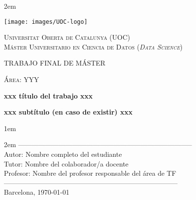 \newpage
\thispagestyle{empty}

\baselineskip 2em


\centerline{\texttt{[image: images/UOC-logo]}}
\begin{center}
\textsc{Universitat Oberta de Catalunya (UOC) \\
 Máster Universitario en Ciencia de Datos (\textit{Data Science})\\}


\vspace*{1.5cm}

\textsc{\Large TRABAJO FINAL DE MÁSTER}

\vspace*{0.5cm}

\textsc{\large Área: YYY}



\vspace*{2.0cm}

\textbf{\Large xxx título del trabajo xxx}

\textbf{\large xxx subtítulo (en caso de existir) xxx}

\vspace{2.5cm}
\baselineskip 1em

\baselineskip 2em
-----------------------------------------------------------------------------\\
Autor:      Nombre completo del estudiante\\
Tutor:      Nombre del colaborador/a docente\\
Profesor:   Nombre del profesor responsable del área de TF\\
-----------------------------------------------------------------------------\\
\vspace*{1.5cm}
Barcelona, \today

\end{center}

\newpage
\pagestyle{empty}
\hfill
